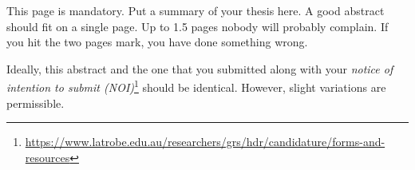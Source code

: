 This page is mandatory. Put a summary of your thesis here. A good abstract should fit on a single page. Up to 1.5 pages nobody will probably complain. If you hit the two pages mark, you have done something wrong.

Ideally, this abstract and the one that you submitted along with your \emph{notice of intention to submit (NOI)}\footnote{\url{https://www.latrobe.edu.au/researchers/grs/hdr/candidature/forms-and-resources}} should be identical. However, slight variations are permissible. 

